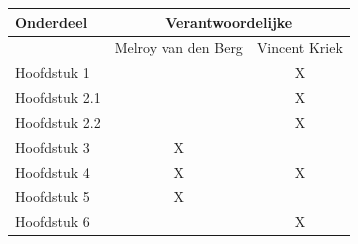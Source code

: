 \documentclass[]{article}
\begin{document}
\begin{tabular}{|| l | c | c ||}\hline
    Onderdeel           &   \multicolumn{2}{|c||}{Verantwoordelijke} \\\hline
                        & Melroy van den Berg & Vincent Kriek        \\\hline\hline
    Hoofdstuk 1         &                     &  X                   \\\hline
    Hoofdstuk 2.1       &                     &  X                   \\\hline
    Hoofdstuk 2.2       &                     &  X                   \\\hline
    Hoofdstuk 3         &       X             &                      \\\hline
    Hoofdstuk 4         &       X             &  X                   \\\hline
    Hoofdstuk 5         &       X             &                      \\\hline
    Hoofdstuk 6         &                     &  X                   \\\hline
\end{tabular}
\end{document}
